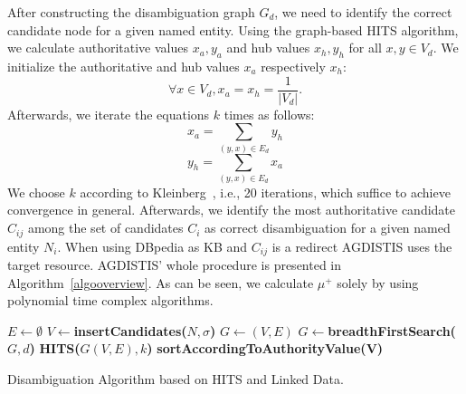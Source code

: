 After constructing the disambiguation graph $G_d$, we need to identify the correct candidate node for a given named entity.
Using the graph-based  \ac{HITS} algorithm, we calculate authoritative values $x_a,y_a$ and hub values $x_h,y_h$ for all $x,y\in V_d$.
We initialize the authoritative and hub values $x_a$ respectively $x_h$:
\begin{equation}
\forall x \in V_d, x_a=x_h=\frac{1}{|V_d|}  .
\end{equation}
Afterwards, we iterate the equations $k$ times as follows: 
\begin{equation}
x_a = \sum_{(y,x)\in E_d} y_h
\end{equation}
\begin{equation}
y_h = \sum_{(y,x)\in E_d} x_a 
\end{equation}
We choose $k$ according to Kleinberg~\cite{HITS}, i.e., 20 iterations, which suffice to achieve convergence in general. %
Afterwards, we identify the most authoritative candidate $C_{ij}$ among the set of candidates $C_i$ as correct disambiguation for a given named entity $N_i$. %
When using DBpedia as \ac{KB} and $C_{ij}$ is a redirect AGDISTIS uses the target resource. %
AGDISTIS' whole procedure is presented in Algorithm~\ref{algooverview}.
As can be seen, we calculate $\mu^{+}$ solely by using polynomial time complex algorithms.
\begin{algorithm}[htb!]
$E \longleftarrow \emptyset$\;
$V \longleftarrow${\bf insertCandidates($N, \sigma$)}\;
$G \longleftarrow (V,E)$\;
$G \longleftarrow${\bf breadthFirstSearch($G,d$)}\;
{\bf  HITS($G(V,E), k$)}\;
{\bf sortAccordingToAuthorityValue(V)}\;
 {
}
\caption{Disambiguation Algorithm based on \ac{HITS} and Linked Data.}
\label{algooverview}
\end{algorithm}



